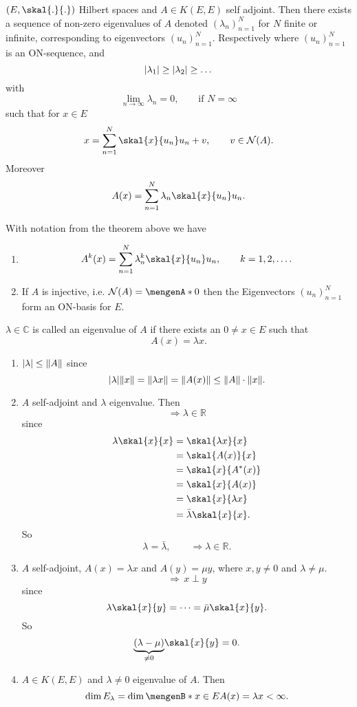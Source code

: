 \begin{theorem}
	$(E, \skal{.}{.})$ Hilbert spaces and $A \in K(E,E)$ self adjoint. Then there exists a sequence of non-zero eigenvalues of $A$ denoted
	$(\lambda_n)_{n=1}^{N}$ for $N$ finite or infinite, corresponding to eigenvectors $(u_n)_{n=1}^{N}$. Respectively where $(u_n)_{n=1}^{N}$ is an ON-sequence, and
	\[
		\lvert\lambda_1\rvert \geq \lvert\lambda_2\rvert \geq \dots
	\]
	with 
	\[
		\lim_{n \to \infty} \lambda_n = 0, \qquad \text{if } N= \infty
	\]
	such that for $x \in E$
	\[
		x = \sum_{n=1}^{N}\skal{x}{u_n}u_n +v, \qquad v \in \mathcal{N}(A).
	\]
	Moreover
	\[
		A(x) = \sum_{n=1}^{N} \lambda_n \skal{x}{u_n}u_n.
	\]
\end{theorem}
\begin{bemerkung}
	With notation from the theorem above we have
	\begin{enumerate}
		\item \[
		A^k(x) = \sum_{n=1}^{N} \lambda_n^k \skal{x}{u_n}u_n, \qquad k=1,2,\dots.
	\]
	\item If $A$ is injective, i.e. $\mathcal{N}(A) = \set{0}$ then the Eigenvectors $(u_n)_{n=1}^{N}$ form an ON-basis for $E$.
	\end{enumerate}
\end{bemerkung}
\begin{definition*}
	$\lambda \in \mathbb{C}$ is called an eigenvalue of $A$ if there exists an $0 \neq x \in E$ such that
	\[
		A(x) = \lambda x.
	\]
\end{definition*}
\begin{bemerkung}
	\begin{enumerate}
		\item $\abs{\lambda} \leq \norm{A}$ since
		\[
			\abs{\lambda} \norm{x} =\norm{\lambda x} = \norm{A(x)} \leq \norm{A} \cdot \norm{x}.
		\]
		\item $A$ self-adjoint and $\lambda$ eigenvalue. Then
		\[
			\Rightarrow \lambda \in \mathbb{R}
		\]
		since
		\begin{align*}
			\lambda \skal{x}{x} &= \skal{\lambda x}{x} \\ &= \skal{A(x)}{x} \\ &= \skal{x}{A^*(x)} \\ &= \skal{x}{A(x)} \\ &= \skal{x}{\lambda x} \\ & = \bar{\lambda} \skal{x}{x}.
		\end{align*}
		So \[
			\lambda = \bar{\lambda}, \qquad \Rightarrow \lambda \in \mathbb{R}.
		\]
		\item $A$ self-adjoint, $A(x) = \lambda x$ and $A(y) = \mu y$, where $x,y \neq 0$ and $\lambda \neq  \mu $.
		\[
			\Rightarrow \,x \perp y
		\]
		since
		\[
			\lambda \skal{x}{y} = \dots = \bar{\mu} \skal{x}{y}.
		\]
		So
		\[
			\underset{\neq 0}{\underbrace{( \lambda - \mu)}}\skal{x}{y} = 0.
		\]
		\item $A \in K(E,E)$ and $\lambda \neq 0$ eigenvalue of $A$. Then
		\[
			\dim E_\lambda = \dim \set[x \in E]{A(x)= \lambda x} < \infty. 
		\]
	\end{enumerate}
\end{bemerkung}
